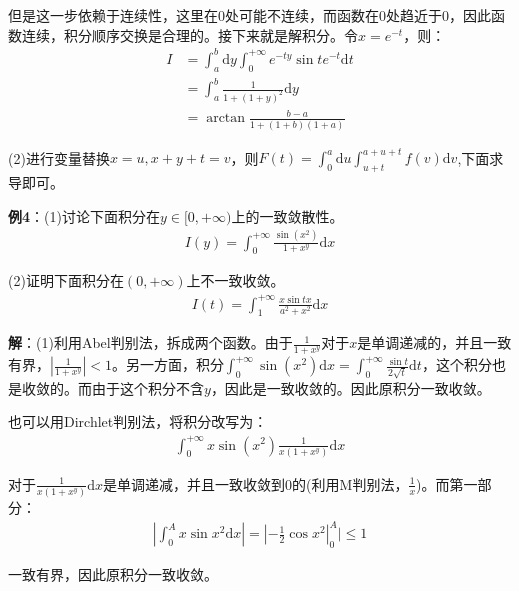 \documentclass{ctexart}
\let\oldtextbf\textbf
\renewcommand{\textbf}[1]{\textcolor{brown!50!red}{\oldtextbf{#1}}}
\begin{document}
但是这一步依赖于连续性，这里在0处可能不连续，而函数在0处趋近于0，因此函数连续，积分顺序交换是合理的。接下来就是解积分。令$x=e^{-t}$，则：
\begin{align*}
I&=\int_a^b\mathrm{d}y \int^{+\infty}_0e^{-ty}\sin te^{-t}\mathrm{d}t \\
&=\int_a^b\frac{1}{1+(1+y)^2} \mathrm{d}y \\
&=\arctan \frac{b-a}{1+(1+b)(1+a)}  
\end{align*}

(2)进行变量替换$x=u,x+y+t=v$，则$F(t)=\int_0^a\mathrm{d}u\int_{u+t}^{a+u+t}f(v)\mathrm{d}v$,下面求导即可。

\textbf{\color{brown!50!red} 例4}：(1)讨论下面积分在$y\in[0,+\infty)$上的一致敛散性。
\begin{align*}
    I(y)=\int_0^{+\infty}\frac{\sin (x^2)}{1+x^y}\mathrm{d}x
\end{align*}

(2)证明下面积分在$(0,+\infty)$上不一致收敛。
\begin{align*}
    I(t)=\int_1^{+\infty}\frac{x\sin tx}{a^2+x^2}\mathrm{d}x
\end{align*}

	\textbf{\color{brown!50!red} 解}：(1)利用Abel判别法，拆成两个函数。由于$\frac{1}{1+x^y}$对于$x$是单调递减的，并且一致有界，$|\frac{1}{1+x^y}|<1$。另一方面，积分$\int_0^{+\infty}\sin(x^2)\mathrm{d}x=\int_0^{+\infty}\frac{\sin t}{2\sqrt{t}}\mathrm{d}t$，这个积分也是收敛的。而由于这个积分不含$y$，因此是一致收敛的。因此原积分一致收敛。
\begin{tcolorbox}[
    colback=bac1,     %
    colframe=fra1,   %
    coltitle=white!80,    
    coltext=tex1,%
    title=另一种办法,
    fonttitle=\bfseries,        %
    arc=2mm,                     %
    breakable
]

也可以用Dirchlet判别法，将积分改写为：
\begin{align}
    \int_0^{+\infty}x\sin(x^2)\frac{1}{x(1+x^y)}\mathrm{d}x
\end{align}

对于$\frac{1}{x(1+x^y)}\mathrm{d}x$是单调递减，并且一致收敛到0的(利用M判别法，$\frac{1}{x}$)。而第一部分：
\begin{align*}
    |\int_0^A x\sin x^2\mathrm{d}x|=|-\frac{1}{2}\cos x^2|_0^A|\leq 1
\end{align*}

一致有界，因此原积分一致收敛。
\end{tcolorbox}
\end{document}

